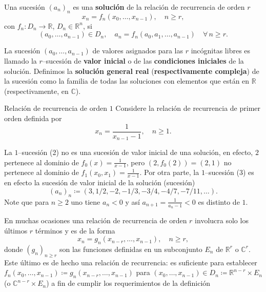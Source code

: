 \begin{definition}
	Una sucesión ${\left(a_{n}\right)}_{n}$ es una \textbf{solución} de la relación de recurrencia de orden $r$
	\begin{equation}
	x_{n}=f_{n}\left(x_{0},\ldots,x_{n-1}\right),\quad n\geq r,
	\end{equation}
	con $f_{n}\colon D_{n}\rightarrow\mathds{R}$, $D_{n}\in\mathds{R}^{n}$, si
	\begin{equation*}
	\left(a_{0},\ldots,a_{n-1}\right)\in D_{n},\quad a_{n}=f_{n}\left(a_{0},a_{1},\ldots,a_{n-1}\right)\quad\forall\,n\geq r.
	\end{equation*}
\end{definition}

La sucesión $\left(a_{0},\ldots,a_{n-1}\right)$ de valores asignados para las $r$ incógnitas libres es llamado la $r$--sucesión de \textbf{valor inicial} o de las \textbf{condiciones iniciales} de la solución. Definimos la \textbf{solución general real} (\textbf{respectivamente compleja}) de la sucesión como la familia de todas las soluciones con elementos que están en $\mathds{R}$ (respectivamente, en $\mathds{C}$).

\begin{example}{Relación de recurrencia de orden $1$}
	Considere la relación de recurrencia de primer orden definida por \[x_{n}=\frac{1}{x_{n-1}-1},\quad n\geq1.\]
\end{example}

La $1$--sucesión (2) no es una sucesión de valor inicial de una solución, en efecto, $2$ pertenece al dominio de $f_{0}\left(x\right)=\frac{1}{x-1}$, pero $\left(2,f_{0}(2)\right)=\left(2,1\right)$ no pertenece al dominio de $f_{1}\left(x_{0},x_{1}\right)=\frac{1}{x-1}$. Por otra parte, la $1$--sucesión (3) es en efecto la sucesión de valor inicial de la solución (sucesión) \[\left(a_{n}\right)_{n}\coloneqq\left(3,1/2,-2,-1/3,-3/4,-4/7,-7/11,\ldots\right).\]
Note que para $n\geq2$ uno tiene $a_{n}<0$ y así $a_{n+1}=\frac{1}{a_{n}-1}<0$ es distinto de $1$.

\begin{example}{}
	En muchas ocasiones una relación de recurrencia de orden $r$ involucra solo los últimos $r$ términos y es de la forma
	\begin{equation*}
	x_{n}=g_{n}\left(x_{n-r},\ldots,x_{n-1}\right),\quad n\geq r,
	\end{equation*}
	donde ${\left(g_{n}\right)}_{n\geq r}$ son las funciones definidas en un subconjunto $E_{n}$ de $\mathds{R}^{r}$ o $\mathds{C}^{r}$. Este último es de hecho una relación de recurrencia: es suficiente para establecer $f_{n}\left(x_{0},\ldots,x_{n-1}\right)\coloneqq g_{n}\left(x_{n-r},\ldots,x_{n-1}\right)$ para $\left(x_{0},\ldots,x_{n-1}\right)\in D_{n}\coloneqq\mathds{R}^{n-r}\times E_{n}$ (o $\mathds{C}^{n-r}\times E_{n}$) a fin de cumplir los requerimientos de la definición %
\end{example}

